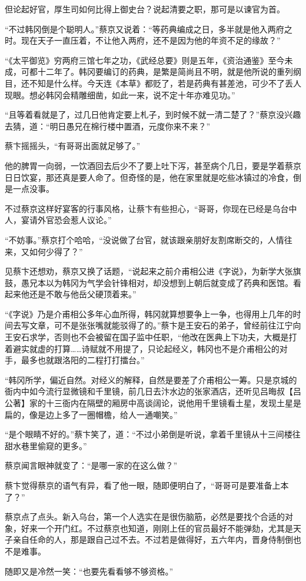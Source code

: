 但论起好官，厚生司如何比得上御史台？说起清要之职，那可是以谏官为首。

“不过韩冈倒是个聪明人。”蔡京又说着：“等药典编成之日，多半就是他入两府之时。现在天子一直压着，不让他入两府，还不是因为他的年资不足的缘故？”

“《太平御览》穷两府三馆七年之功，《武经总要》则是五年，《资治通鉴》至今未成，可都十二年了。韩冈要编订的药典，是繁是简尚且不明，就是他所说的重列纲目，还不知是什么样。今天连《本草》都贬了，若是药典有甚差池，可少不了丢人现眼。想必韩冈会精雕细凿，如此一来，说不定十年亦难见功。”

“且等着看就是了，过几日他肯定要上札子，到时候不就一清二楚了？”蔡京没兴趣去猜，道：“明日愚兄在棉行楼中置酒，元度你来不来？”

蔡卞摇摇头，“有哥哥出面就足够了。”

他的脾胃一向弱，一饮酒回去后少不了要上吐下泻，甚至病个几日，要是学着蔡京日日饮宴，那还真是要人命了。但奇怪的是，他在家里就是吃些冰镇过的冷食，倒是一点没事。

不过蔡京这样好宴客的行事风格，让蔡卞有些担心，“哥哥，你现在已经是乌台中人，宴请外官恐会惹人议论。”

“不妨事。”蔡京打个哈哈，“没说做了台官，就该跟亲朋好友割席断交的，人情往来，又如何少得了？”

见蔡卞还想劝，蔡京又换了话题，“说起来之前介甫相公进《字说》，为新学大张旗鼓，愚兄本以为韩冈为气学会针锋相对，却没想到上朝后就变成了药典和医馆。看起来他还是不敢与他岳父硬顶着来。”

“《字说》乃是介甫相公多年心血所得，韩冈就算想要争上一争，也得用上几年的时间去写文章，可不是张张嘴就能驳得了的。”蔡卞是王安石的弟子，曾经前往江宁向王安石求学，否则也不会被留在国子监中任职，“他改在医典上下功夫，大概是打着避实就虚的打算……诗赋就不用提了，只论起经义，韩冈也不是介甫相公的对手，最多也就跟洛阳的二程打打擂台。”

“韩冈所学，偏近自然。对经义的解释，自然是要差了介甫相公一筹。只是京城的衙内中如今流行显微镜和千里镜，前几日去汴水边的张家酒店，还听见吕晦叔【吕公著】家的十三衙内在隔壁的厢房中高谈阔论，说他用千里镜看土星，发现土星是扁的，像是边上多了一圈帽檐，给人一通嘲笑。”

“是个眼睛不好的。”蔡卞笑了，道：“不过小弟倒是听说，拿着千里镜从十三间楼往甜水巷里偷窥的更多。”

蔡京闻言眼神就变了：“是哪一家的在这么做？”

蔡卞觉得蔡京的语气有异，看了他一眼，随即便明白了，“哥哥可是要准备上本了？”

蔡京点了点头。新入乌台，第一个人选实在是很伤脑筋，必然是要找个合适的对象，好来一个开门红。不过蔡京也知道，刚刚上任的官员最好不能弹劾，尤其是天子亲自任命的人，那是跟自己过不去。不过若是做得好，五六年内，晋身侍制倒也不是难事。

随即又是冷然一笑：“也要先看看够不够资格。”

